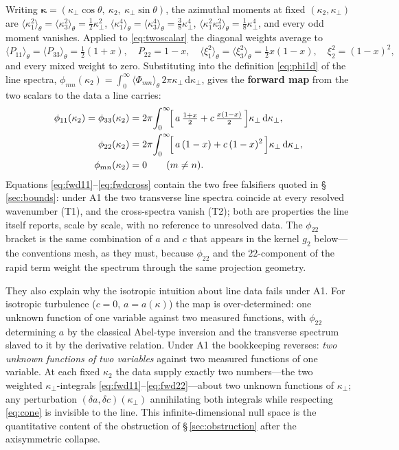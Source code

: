 \documentclass[11pt,a4paper]{article}
\begin{document}
Writing
$\boldsymbol{\kappa}=(\kappa_\perp\cos\theta,\ \kappa_2,\
\kappa_\perp\sin\theta)$, the azimuthal moments at fixed
$(\kappa_2,\kappa_\perp)$ are
$\langle\kappa_1^2\rangle_\theta=\langle\kappa_3^2\rangle_\theta
=\tfrac12\kappa_\perp^2$,
$\langle\kappa_1^4\rangle_\theta=\langle\kappa_3^4\rangle_\theta
=\tfrac38\kappa_\perp^4$,
$\langle\kappa_1^2\kappa_3^2\rangle_\theta=\tfrac18\kappa_\perp^4$, and
every odd moment vanishes. Applied to \eqref{eq:twoscalar} the diagonal
weights average to
\begin{equation}
  \langle P_{11}\rangle_\theta=\langle P_{33}\rangle_\theta
  =\tfrac12(1+x), \quad
  P_{22}=1-x, \quad
  \langle \xi_1^2\rangle_\theta=\langle \xi_3^2\rangle_\theta
  =\tfrac12 x(1-x), \quad
  \xi_2^2=(1-x)^2 ,
  \label{eq:azweights}
\end{equation}
and every mixed weight to zero. Substituting into the definition
\eqref{eq:phi1d} of the line spectra,
$\phi_{mn}(\kappa_2)=\int_0^\infty\langle\Phi_{mn}\rangle_\theta\,
2\pi\kappa_\perp\,\mathrm{d}\kappa_\perp$, gives the \textbf{forward map}
from the two scalars to the data a line carries:
\begin{align}
  \phi_{11}(\kappa_2)=\phi_{33}(\kappa_2)
  &= 2\pi\!\int_0^\infty\!
     \Bigl[\,a\,\tfrac{1+x}{2} + c\,\tfrac{x(1-x)}{2}\,\Bigr]
     \kappa_\perp\,\mathrm{d}\kappa_\perp ,
  \label{eq:fwd11}\\
  \phi_{22}(\kappa_2)
  &= 2\pi\!\int_0^\infty\!
     \Bigl[\,a\,(1-x) + c\,(1-x)^{2}\,\Bigr]
     \kappa_\perp\,\mathrm{d}\kappa_\perp ,
  \label{eq:fwd22}\\
  \phi_{mn}(\kappa_2) &= 0 \qquad (m\ne n).
  \label{eq:fwdcross}
\end{align}
Equations \eqref{eq:fwd11}--\eqref{eq:fwdcross} contain the two free
falsifiers quoted in \S\,\ref{sec:bounds}: under A1 the two transverse
line spectra coincide at every resolved wavenumber (T1), and the
cross-spectra vanish (T2); both are properties the line itself reports,
scale by scale, with no reference to unresolved data. The
$\phi_{22}$ bracket is the same combination of $a$ and $c$ that appears in
the kernel $g_2$ below---the conventions mesh, as they must, because
$\phi_{22}$ and the $22$-component of the rapid term weight the spectrum
through the same projection geometry.

They also explain why the isotropic intuition about line data fails under
A1. For isotropic turbulence ($c=0$, $a=a(\kappa)$) the map is
over-determined: one unknown function of one variable against two measured
functions, with $\phi_{22}$ determining $a$ by the classical Abel-type
inversion and the transverse spectrum slaved to it by the derivative
relation. Under A1 the bookkeeping reverses: \emph{two unknown functions
of two variables} against two measured functions of one variable. At each
fixed $\kappa_2$ the data supply exactly two numbers---the two weighted
$\kappa_\perp$-integrals \eqref{eq:fwd11}--\eqref{eq:fwd22}---about two
unknown functions of $\kappa_\perp$; any perturbation
$(\delta a,\delta c)(\kappa_\perp)$ annihilating both integrals while
respecting \eqref{eq:cone} is invisible to the line. This
infinite-dimensional null space is the quantitative content of the
obstruction of \S\,\ref{sec:obstruction} after the axisymmetric collapse.
\end{document}
